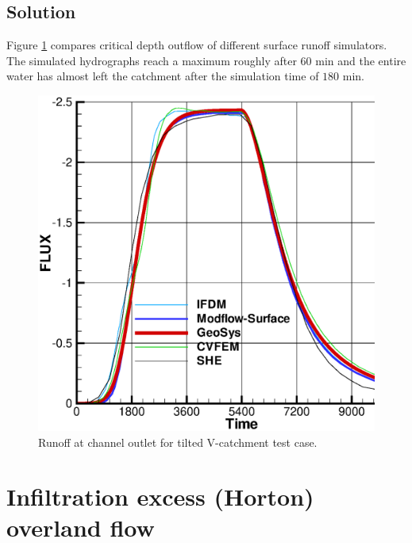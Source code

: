 \subsection{Solution}
%
Figure \ref{OLF:giammarco} compares critical depth outflow of different surface runoff simulators.
The simulated hydrographs reach a maximum roughly after $60$ min 
and the entire water has almost left the catchment after the simulation time of $180$ min.
%
\begin{figure} [htb!]
 \centering
 \includegraphics[width=0.75\columnwidth] {PART_II/H_SFC/gian.eps}
 \caption{Runoff at channel outlet for tilted V-catchment test case.}
 \label{OLF:giammarco}
\end{figure}
%
\section{Infiltration excess (Horton) overland flow} \label{sec:horton}
%

